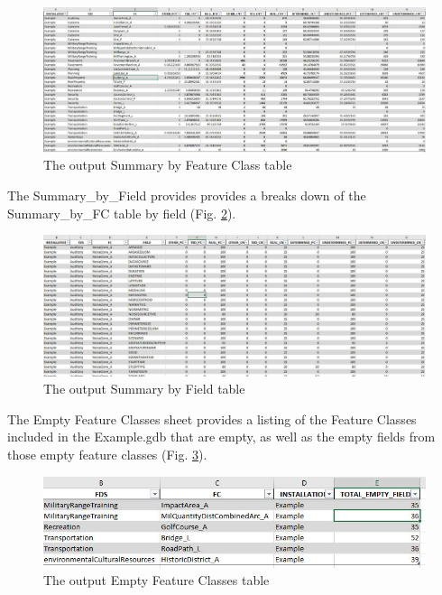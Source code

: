 \documentclass[openany]{book}
\theoremstyle{definition}
\theoremstyle{definition}
\theoremstyle{definition}
\theoremstyle{remark}
\begin{document}
\begin{figure}[H]

{\centering \includegraphics{figures/summIndt-sheet1} 

}

\caption{The output Summary by Feature Class table}\label{fig:summIndtsheet1}
\end{figure}

The Summary\_by\_Field provides provides a breaks down of the
Summary\_by\_FC table by field (Fig. \ref{fig:summIndtsheet2}).

\begin{figure}[H]

{\centering \includegraphics{figures/summIndt-sheet2} 

}

\caption{The output Summary by Field table}\label{fig:summIndtsheet2}
\end{figure}

The Empty Feature Classes sheet provides a listing of the Feature
Classes included in the Example.gdb that are empty, as well as the empty
fields from those empty feature classes (Fig. \ref{fig:summIndtsheet3}).

\begin{figure}[H]

{\centering \includegraphics{figures/summIndt-sheet3} 

}

\caption{The output Empty Feature Classes table}\label{fig:summIndtsheet3}
\end{figure}
\end{document}
